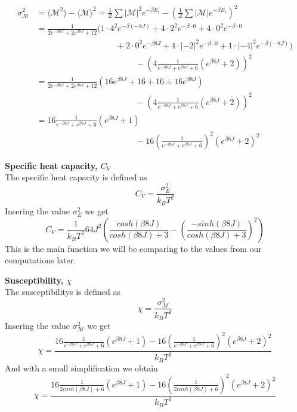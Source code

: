 \documentclass[../main.tex]{subfiles}
\begin{document}
    \begin{align*}
      \sigma^2_\mathcal{M} &= \langle \mathcal{M}^2 \rangle - \langle \mathcal{M} \rangle ^2 = \frac{1}{Z}\sum |\mathcal{M}|^2 e^{-\beta E_i} - \left( \frac{1}{Z} \sum |\mathcal{M}| e^{-\beta E_i} \right)^2\\
      &= \frac{1}{2e^{-\beta 8J} + 2e^{\beta 8J} + 12} \Big( 1\cdot 4^2 e^{-\beta (-8J)} + 4 \cdot 2^2  e^{-\beta\cdot 0} + 4 \cdot 0^2 e^{-\beta\cdot 0}\\
      &\hspace{4cm} + 2\cdot 0^2  e^{-\beta 8J} + 4 \cdot |-2|^2 e^{-\beta \cdot 0} + 1 \cdot |-4|^2 e^{-\beta (-8J)} \Big)\\
      &\hspace{5cm} - \left(4\frac{1}{e^{-\beta 8J} + e^{\beta 8J} + 6}\left( e^{\beta 8J} +2 \right)\right)^2\\
      &=\frac{1}{2e^{-\beta 8J} + 2e^{\beta 8J} + 12} \left(16e^{\beta 8J} + 16 + 16 + 16e^{\beta 8J} \right)\\
      &\hspace{5cm} - \left(4\frac{1}{e^{-\beta 8J} + e^{\beta 8J} + 6}\left( e^{\beta 8J} +2 \right)\right)^2\\
      &=16 \frac{1}{e^{-\beta 8J} + e^{\beta 8J} + 6} \left(e^{\beta 8J} + 1\right)\\
      &\hspace{5cm} - 16\left(\frac{1}{e^{-\beta 8J} + e^{\beta 8J} + 6}\right)^2\left( e^{\beta 8J} +2 \right)^2
    \end{align*}


    \textbf{Specific heat capacity, $C_V$}\\
    The specific heat capacity is defined as
    \[C_V = \frac{\sigma_E^2}{k_B T^2}\]
    Insering the value $\sigma^2_E$ we get
      \[C_V = \frac{1}{k_B T^2}64J^2\left(\frac{cosh(\beta 8 J)}{cosh(\beta 8 J) + 3} -\left(\frac{-sinh(\beta 8 J)}{cosh(\beta 8 J) + 3}\right)^2  \right)\]
    This is the main function we will be comparing to the values from our computations later.

    \textbf{Susceptibility, $\chi$}\\
    The susceptibilitys is defined as
    \[\chi = \frac{\sigma^2_\mathcal{M}}{k_B T^2}\]
    Insering the value $\sigma^2_\mathcal{M}$ we get
    \[\chi = \frac{16 \frac{1}{e^{-\beta 8J} + e^{\beta 8J} + 6} \left(e^{\beta 8J} + 1\right)- 16\left(\frac{1}{e^{-\beta 8J} + e^{\beta 8J} + 6}\right)^2\left( e^{\beta 8J} +2 \right)^2}{k_B T^2}\]
    And with a small simplification we obtain
    \[\chi = \frac{16 \frac{1}{2cosh(\beta 8J) + 6} \left(e^{\beta 8J} + 1\right)- 16\left(\frac{1}{2cosh(\beta 8J) + 6}\right)^2\left( e^{\beta 8J} +2 \right)^2}{k_B T^2}\]\\
\end{document}

